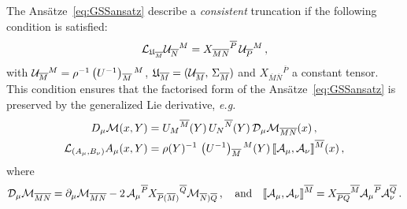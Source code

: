 \documentclass[a4paper, 11pt]{article}
\numberwithin{equation}{section}
\newcommand{\ff}[1]{\mathfrak{#1}}
\newcommand{\ov}[1]{\overline{#1}}
\newcommand{\+}{\oplus}
\newcommand{\gL}{\mathcal{L}}
\newcommand{\cU}{{\cal U}}
\newcommand{\UI}{\left(U^{-1}\right)}
\newcommand{\fl}[1]{\ov{#1}}
\newcommand{\M}{\ensuremath{\mathcal{M}}\xspace}
\newcommand{\A}{\ensuremath{\mathcal{A}}\xspace}
\begin{document}
The Ansätze~\eqref{eq:GSSansatz} describe a \textit{consistent} truncation if the following condition is satisfied:
\begin{equation} \label{eq:GenLeibniz}
	\gL_{\ff{U}_{\fl{M}}} {\cU}_{\fl{N}}{}^M = X_{\fl{M}\fl{N}}{}^{\fl{P}}\, \cU_{\fl{P}}{}^M\,,
\end{equation}
with $\cU_{\fl{M}}{}^M = \rho^{-1} \UI_{\fl{M}}{}^M$, $\ff{U}_{\fl{M}} = (\cU_{\fl{M}},\,\Sigma_{\fl{M}})$ and $X_{\fl{M}\fl{N}}{}^{\fl{P}}$ a constant tensor. This condition ensures that the factorised form of the Ansätze~\eqref{eq:GSSansatz} is preserved by the generalized Lie derivative, \textit{e.g.}
\begin{equation} \label{eq:GSSexample}
	\begin{aligned}
		D_{\mu}\M(x,Y) &= U_{M}{}^{\fl{M}}(Y)\,U_{N}{}^{\fl{N}}(Y)\,{\cal D}_{\mu}\M_{\fl{MN}}(x)\,,\\
		{\cal L}_{(A_{\mu},B_{\nu})}A_{\mu}(x,Y) &= \rho(Y)^{-1}\,\UI_{\fl{M}}{}^{M}(Y)\,\llbracket\A_{\mu},\A_{\nu}\rrbracket^{\fl{M}}(x)\,,
	\end{aligned}
\end{equation}
where
\begin{equation} \label{eq:3dCovDeriv}
	{\cal D}_{\mu}\M_{\fl{MN}} = \partial_{\mu}\M_{\fl{MN}}-2\,\A_{\mu}{}^{\fl{P}}X_{\fl{P}(\fl{M})}{}^{\fl{Q}}\M_{\fl{N})\fl{Q}}\,, \quad {\rm and} \quad \llbracket\A_{\mu},\A_{\nu}\rrbracket^{\fl{M}}=X_{\fl{PQ}}{}^{\fl{M}}\A_{\mu}{}^{\fl{P}}\A_{\nu}^{\fl{Q}} \,.
\end{equation}
\end{document}
